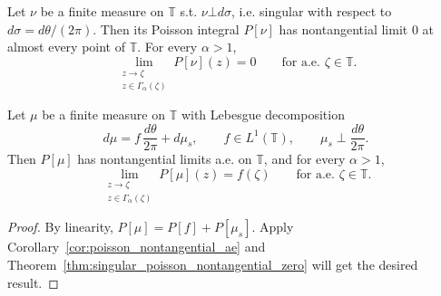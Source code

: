 \begin{theorem}
\label{thm:singular_poisson_nontangential_zero}
Let $\nu$ be a finite measure on $\mathbb{T}$ s.t. $\nu\bot d\sigma$, i.e. singular
with respect to $d\sigma = d\theta/(2\pi)$. Then its Poisson integral $P[\nu]$ has
nontangential limit 0 at almost every point of $\mathbb{T}$. For every $\alpha>1$,
\begin{equation*}
  \lim_{\substack{z\to\zeta\\ z\in\Gamma_\alpha(\zeta)}}P[\nu](z)=0
  \qquad\text{for a.e. }\zeta\in\mathbb{T}.
\end{equation*}
\end{theorem}

\begin{theorem}
\label{thm:fatou_signed_measure}
Let $\mu$ be a finite measure on $\mathbb{T}$ with Lebesgue
decomposition
\begin{equation*}
  d\mu=f\,\frac{d\theta}{2\pi}+d\mu_s,
  \qquad f\in L^1(\mathbb{T}),
  \qquad \mu_s\perp\frac{d\theta}{2\pi}.
\end{equation*}
Then $P[\mu]$ has nontangential limits a.e. on $\mathbb{T}$, and for every $\alpha>1$,
\begin{equation*}
  \lim_{\substack{z\to\zeta\\ z\in\Gamma_\alpha(\zeta)}}P[\mu](z)=f(\zeta)
  \qquad\text{for a.e. }\zeta\in\mathbb{T}.
\end{equation*}
\end{theorem}
\begin{proof}
By linearity, $P[\mu]=P[f]+P[\mu_s]$. Apply
Corollary~\ref{cor:poisson_nontangential_ae} and
Theorem~\ref{thm:singular_poisson_nontangential_zero} will get the desired result.
\end{proof}





